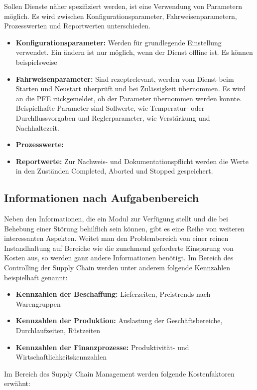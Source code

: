 Sollen Dienste näher spezifiziert werden, ist eine Verwendung von Parametern möglich. Es wird zwischen Konfigurationsparameter, Fahrweisenparametern, Prozesswerten und Reportwerten unterschieden.
\begin{itemize}
\item \textbf{Konfigurationsparameter:} Werden für grundlegende Einstellung verwendet. Ein ändern ist nur möglich, wenn der Dienst offline ist. Es können beispielsweise 
\item \textbf{Fahrweisenparameter:} Sind rezeptrelevant, werden vom Dienst beim Starten und Neustart überprüft und bei Zulässigkeit übernommen. Es wird an die PFE rückgemeldet, ob der Parameter übernommen werden konnte. Beispielhafte Parameter sind Sollwerte, wie Temperatur- oder Durchflussvorgaben und Reglerparameter, wie Verstärkung und Nachhaltezeit.
\item \textbf{Prozesswerte:} 
\item \textbf{Reportwerte:} Zur Nachweis- und Dokumentationspflicht werden die Werte in den Zuständen Completed, Aborted und Stopped gespeichert.
\end{itemize}

\subsection{Informationen nach Aufgabenbereich}
Neben den Informationen, die ein Modul zur Verfügung stellt und die bei Behebung einer Störung behilflich sein können, gibt es eine Reihe von weiteren interessanten Aspekten. Weitet man den Problembereich von einer reinen Instandhaltung auf Bereiche wie die zunehmend geforderte Einsparung von Kosten aus, so werden ganz andere Informationen benötigt. Im Bereich des Controlling der Supply Chain werden unter anderem folgende Kennzahlen beispielhaft genannt:
\begin{itemize}
\item \textbf{Kennzahlen der Beschaffung:} Lieferzeiten, Preistrends nach Warengruppen
\item \textbf{Kennzahlen der Produktion:} Auslastung der Geschäftsbereiche, Durchlaufzeiten, Rüstzeiten
\item \textbf{Kennzahlen der Finanzprozesse:} Produktivität- und Wirtschaftlichkeitskennzahlen
\end{itemize}
Im Bereich des Supply Chain Management werden folgende Kostenfaktoren erwähnt:
\begin{itemize}

\end{itemize}

